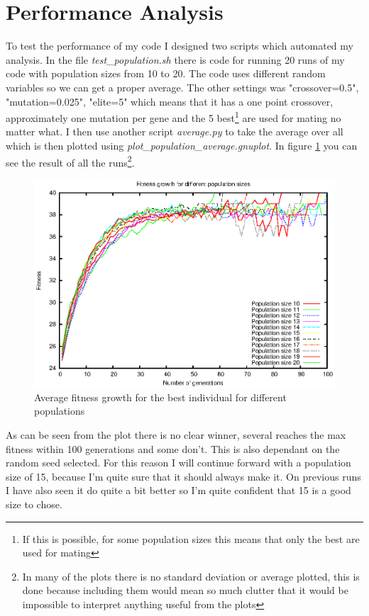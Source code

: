 \section{Performance Analysis}\label{sec:performance analysis}
To test the performance of my code I designed two scripts which automated my
analysis. In the file \textit{test\_population.sh} there is code for running 20
runs of my code with population sizes from 10 to 20. The code uses different
random variables so we can get a proper average. The other settings was
"crossover=0.5", "mutation=0.025", "elite=5" which means that it has a one point
crossover, approximately one mutation per gene and the 5 best\footnote{If this is
possible, for some population sizes this means that only the best are used for
mating} are used for mating no matter what. I then use another script
\textit{average.py} to take the average over all which is then plotted using
\textit{plot\_population\_average.gnuplot}. In figure
\ref{fig:population-average} you can see the result of all the runs\footnote{In
	many of the plots there is no standard deviation or average plotted,
	this is done because including them would mean so much clutter that it
would be impossible to interpret anything useful from the plots}.

\begin{figure}[h!]
	\includegraphics{../graphs/fitness_population_average.eps}
	\caption{Average fitness growth for the best individual for different populations}
	\label{fig:population-average}
\end{figure}

As can be seen from the plot there is no clear winner, several reaches the max
fitness within 100 generations and some don't. This is also dependant on the
random seed selected. For this reason I will continue forward with a population
size of 15, because I'm quite sure that it should always make it. On previous
runs I have also seen it do quite a bit better so I'm quite confident that 15 is
a good size to chose.

